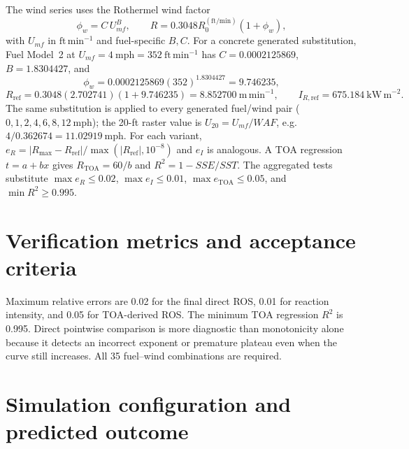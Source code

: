 The wind series uses the Rothermel wind factor
\[
 \phi_w=C\,U_{mf}^{B},\qquad R=0.3048R_0^{(\mathrm{ft/min})}(1+\phi_w),
\]
with \(U_{mf}\) in \(\mathrm{ft\,min^{-1}}\) and fuel-specific \(B,C\).
For a concrete generated substitution, Fuel Model~2 at
\(U_{mf}=4~\mathrm{mph}=352~\mathrm{ft\,min^{-1}}\) has
\(C=0.0002125869\), \(B=1.8304427\), and
\[
 \phi_w=0.0002125869(352)^{1.8304427}=9.746235,
\]
\[
 R_{\mathrm{ref}}=0.3048(2.702741)(1+9.746235)
 =8.852700~\mathrm{m\,min^{-1}},\qquad
 I_{R,\mathrm{ref}}=675.184~\mathrm{kW\,m^{-2}}.
\]
The same substitution is applied to every generated fuel/wind pair
(\(0,1,2,4,6,8,12~\mathrm{mph}\)); the 20-ft raster value is
\(U_{20}=U_{mf}/WAF\), e.g. \(4/0.362674=11.02919~\mathrm{mph}\).
For each variant, \(e_R=|R_{\max}-R_{\mathrm{ref}}|/
\max(|R_{\mathrm{ref}}|,10^{-8})\) and \(e_I\) is analogous.
A TOA regression \(t=a+bx\) gives \(R_{\mathrm{TOA}}=60/b\) and
\(R^2=1-SSE/SST\).  The aggregated tests substitute
\(\max e_R\leq0.02\), \(\max e_I\leq0.01\),
\(\max e_{\mathrm{TOA}}\leq0.05\), and \(\min R^2\geq0.995\).

\section{Verification metrics and acceptance criteria}
Maximum relative errors are 0.02 for the final direct ROS, 0.01 for reaction intensity, and 0.05 for TOA-derived ROS.  The minimum TOA regression $R^2$ is 0.995.  Direct pointwise comparison is more diagnostic than monotonicity alone because it detects an incorrect exponent or premature plateau even when the curve still increases.  All 35 fuel--wind combinations are required.

\section{Simulation configuration and predicted outcome}

